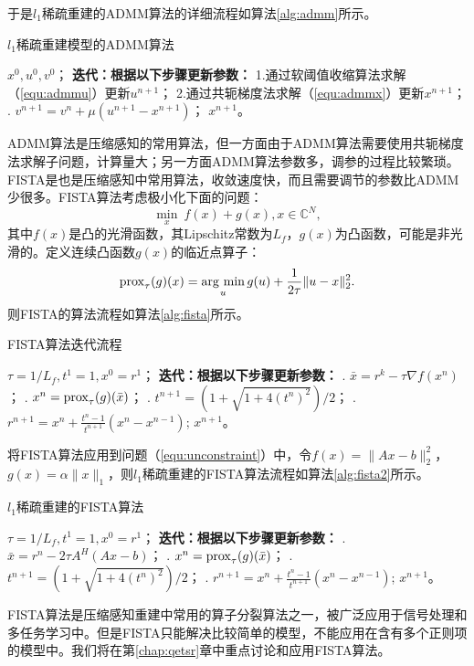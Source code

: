 于是$l_1$稀疏重建的ADMM算法的详细流程如算法\ref{alg:admm}所示。
\begin{algorithm}
	\caption{$l_1$稀疏重建模型的ADMM算法}
	\label{alg:admm}
	\begin{algorithmic}
		\REQUIRE $x^0, u^0, v^0$；
		\INDSTATE[-1.25] \textbf{迭代：根据以下步骤更新参数：}	
		\STATE 1.通过软阈值收缩算法求解（\ref{equ:admmu}）更新$u^{n+1}$；
		\STATE 2.通过共轭梯度法求解（\ref{equ:admmx}）更新$x^{n+1}$；
		. $v^{n+1}=v^{n}+\mu(u^{n+1}-x^{n+1})$；
		\ENSURE $x^{n+1}$。
	\end{algorithmic}
\end{algorithm}

ADMM算法是压缩感知的常用算法，但一方面由于ADMM算法需要使用共轭梯度法求解子问题，计算量大；另一方面ADMM算法参数多，调参的过程比较繁琐。FISTA\cite{fista}是也是压缩感知中常用算法，收敛速度快，而且需要调节的参数比ADMM少很多。FISTA算法考虑极小化下面的问题：
\begin{equation}
	\min_x\ f(x)+g(x),x\in \mathbb{C}^N,
\end{equation}
其中$f(x)$是凸的光滑函数，其Lipschitz常数为$L_f$，$g(x)$为凸函数，可能是非光滑的。定义连续凸函数$g(x)$的临近点算子：
\begin{equation}
	\mathrm{prox}_\tau(g)(x)=\argmin_u g(u)+\frac{1}{2\tau}\|u-x\|^2_2.
\end{equation}
则FISTA的算法流程如算法\ref{alg:fista}所示。
\begin{algorithm}
	\caption{FISTA算法迭代流程}
	\label{alg:fista}
	\begin{algorithmic}
		\REQUIRE $\tau = 1/L_f, t^1=1, x^0=r^1$；
		\INDSTATE[-1.25] \textbf{迭代：根据以下步骤更新参数：}	
		. $\bar{x}=r^k-\tau\nabla f(x^n)$；
		. $x^n=\mathrm{prox}_{\tau}(g)(\bar{x})$；
		. $t^{n+1}=(1+\sqrt{1+4(t^n)^2})/2$；
		. $r^{n+1}=x^n+\frac{t^n-1}{t^{n+1}}(x^n-x^{n-1})$;
		\ENSURE $x^{n+1}$。
	\end{algorithmic}
\end{algorithm}

将FISTA算法应用到问题（\ref{equ:unconstraint}）中，令$f(x)=\|Ax-b\|^2_2$，$g(x)=\alpha\|x\|_1$，则$l_1$稀疏重建的FISTA算法流程如算法\ref{alg:fista2}所示。
\begin{algorithm}
	\caption{$l_1$稀疏重建的FISTA算法}
	\label{alg:fista2}
	\begin{algorithmic}
		\REQUIRE $\tau = 1/L_f, t^1=1, x^0=r^1$；
		\INDSTATE[-1.25] \textbf{迭代：根据以下步骤更新参数：}	
		. $\bar{x}=r^n-2\tau A^H(Ax-b)$；
		. $x^n=\mathrm{prox}_{\tau}(g)(\bar{x})$；
		. $t^{n+1}=(1+\sqrt{1+4(t^n)^2})/2$；
		. $r^{n+1}=x^n+\frac{t^n-1}{t^{n+1}}(x^n-x^{n-1})$;
		\ENSURE $x^{n+1}$。
	\end{algorithmic}
\end{algorithm}
FISTA算法是压缩感知重建中常用的算子分裂算法之一，被广泛应用于信号处理\cite{beck2009fast}和多任务学习\cite{ji2009accelerated}中。但是FISTA只能解决比较简单的模型，不能应用在含有多个正则项的模型中。我们将在第\ref{chap:qetsr}章中重点讨论和应用FISTA算法。

